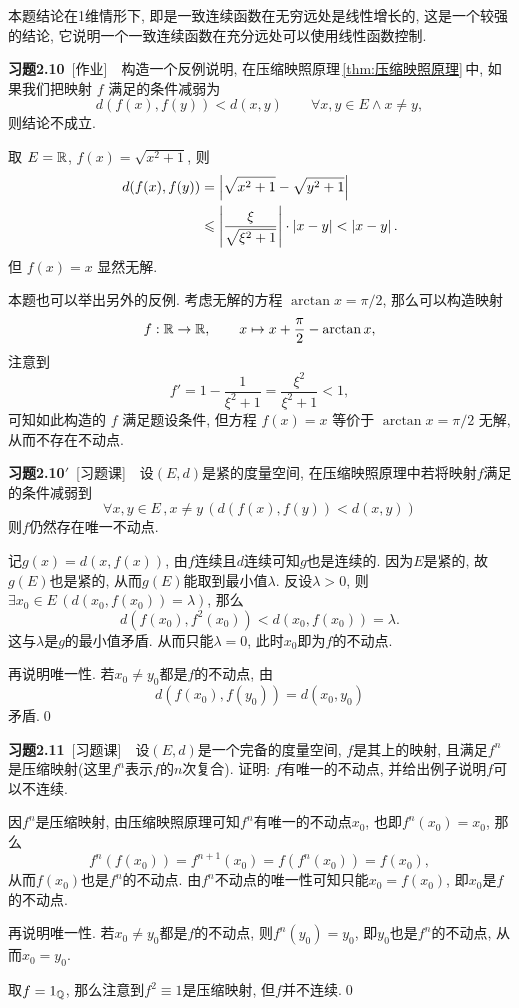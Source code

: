 	\begin{Remark}
		本题结论在1维情形下, 即是一致连续函数在无穷远处是线性增长的, 这是一个较强的结论, 它说明一个一致连续函数在充分远处可以使用线性函数控制.
	\end{Remark}
	
	\textbf{习题2.10}\ [作业]\ \ 构造一个反例说明, 在压缩映照原理\,\ref{thm:压缩映照原理}\,中, 如果我们把映射 $ f $ 满足的条件减弱为
	\[
		d(f(x), f(y))<d(x, y)\qquad \forall x, y\in E\wedge x\neq y,
	\]
	则结论不成立.

	\begin{Solution}
		取 $ E=\mathbb{R} $, $ f(x)=\sqrt{x^{2}+1} $, 则
		\[
			\begin{aligned}
				d(f(x), f(y)) & =\left| \sqrt{x^{2}+1}-\sqrt{y^{2}+1} \right| \\
				& \leqslant\left| \frac{\xi}{\sqrt{\xi^{2}+1}} \right| \cdot\left| x-y \right| <\left| x-y \right| .
			\end{aligned}
		\]
		但 $ f(x)=x $ 显然无解.
	\end{Solution}
	\begin{Remark}
		本题也可以举出另外的反例. 考虑无解的方程 $ \arctan x=\pi/2 $, 那么可以构造映射
		\[
			f : \mathbb{R}\to\mathbb{R},\qquad x\mapsto x+\frac\pi 2-\arctan x,
		\]
		注意到
		\[
			f'=1-\frac{1}{\xi^2+1}=\frac{\xi^2}{\xi^2+1}<1,
		\]
		可知如此构造的 $ f $ 满足题设条件, 但方程 $ f(x)=x $ 等价于 $ \arctan x=\pi/2 $ 无解, 从而不存在不动点.
	\end{Remark}
	
	\textbf{习题2.10$\bm{'}$}\ [习题课]\ \ 设$ (E,d) $是紧的度量空间, 在压缩映照原理中若将映射$ f $满足的条件减弱到
	\[
	\forall x,y\in E\,,x\ne y\,(d(f(x),f(y))<d(x,y))
	\]
	则$ f $仍然存在唯一不动点.
	\begin{Proof}
	记$ g(x)=d(x,f(x)) $, 由$ f $连续且$ d $连续可知$ g $也是连续的. 因为$ E $是紧的, 故$ g(E) $也是紧的, 从而$ g(E) $能取到最小值$ \lambda $. 反设$ \lambda>0 $, 则$ \exists x_0\in E\,(d(x_0,f(x_0))=\lambda) $, 那么
	\[
	d(f(x_0),f^2(x_0))<d(x_0,f(x_0))=\lambda.
	\]
	这与$ \lambda $是$ g $的最小值矛盾. 从而只能$ \lambda=0 $, 此时$ x_0 $即为$ f $的不动点.
	
	再说明唯一性. 若$ x_0\ne y_0 $都是$ f $的不动点, 由
	\[
	d(f(x_0),f(y_0))=d(x_0,y_0)
	\]
	矛盾.\qed
	\end{Proof}
	
	\textbf{习题2.11}\ [习题课]\ \ 设$ (E,d) $是一个完备的度量空间, $ f $是其上的映射, 且满足$ f^n $是压缩映射(这里$ f^n $表示$ f $的$ n $次复合). 证明: $ f $有唯一的不动点, 并给出例子说明$ f $可以不连续.
	\begin{Proof}
	因$ f^n $是压缩映射, 由压缩映照原理可知$ f^n $有唯一的不动点$ x_0 $, 也即$ f^n(x_0)=x_0 $, 那么
	\[
	f^n(f(x_0))=f^{n+1}(x_0)=f(f^n(x_0))=f(x_0),
	\]
	从而$ f(x_0) $也是$ f^n $的不动点. 由$ f^n $不动点的唯一性可知只能$ x_0=f(x_0) $, 即$ x_0 $是$ f $的不动点.
	
	再说明唯一性. 若$ x_0\ne y_0 $都是$ f $的不动点, 则$ f^n(y_0)=y_0 $, 即$ y_0 $也是$ f^n $的不动点, 从而$ x_0=y_0 $.
	
	取$ f=1_{\mathbb{Q}} $, 那么注意到$ f^2\equiv 1 $是压缩映射, 但$ f $并不连续.\qed
	\end{Proof}
	
